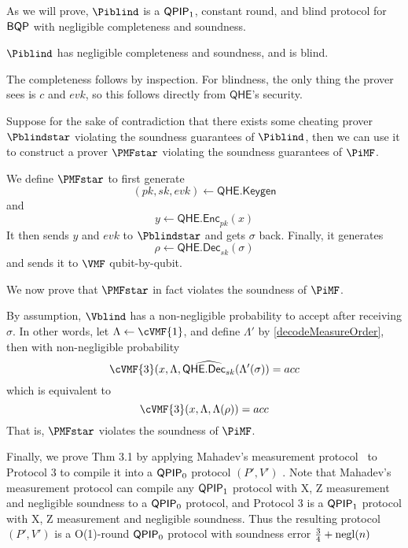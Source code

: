 As we will prove, $\Piblind$ is a $\operatorname{\mathsf{QPIP}}_1$, constant round, and blind protocol for $\operatorname{\mathsf{BQP}}$ with negligible completeness and soundness.

\begin{thm}
	$\Piblind$ has negligible completeness and soundness, and is blind.
\end{thm}
\begin{prf}
	The completeness follows by inspection.
	For blindness, the only thing the prover sees is $c$ and $evk$, so this follows directly from $\mathsf{QHE}$'s security.
	
	Suppose for the sake of contradiction that there exists some cheating prover $\Pblindstar$ violating the soundness guarantees of $\Piblind$,
	then we can use it to construct a prover $\PMFstar$ violating the soundness guarantees of $\PiMF$.


	We define $\PMFstar$ to first generate
	$$(pk, sk, evk)\leftarrow\mathsf{QHE.Keygen}$$
	and
	$$y\leftarrow\mathsf{QHE.Enc}_{pk}(x)$$
	It then sends $y$ and $evk$ to $\Pblindstar$ and gets $\sigma$ back.
	Finally, it generates
	$$\rho\leftarrow\mathsf{QHE.Dec}_{sk}(\sigma)$$
	and sends it to $\VMF$ qubit-by-qubit.

	We now prove that $\PMFstar$ in fact violates the soundness of $\PiMF$.

	By assumption, $\Vblind$ has a non-negligible probability to accept after receiving $\sigma$.
	In other words, let $\Lambda\leftarrow\cVMF{1}$, and define $\Lambda'$ by \cref{decodeMeasureOrder},
	then with non-negligible probability
	$$\cVMF{3}(x, \Lambda, \widehat{\mathsf{QHE.Dec}_{sk}}(\Lambda'(\sigma))=acc$$
	which is equivalent to
	$$\cVMF{3}(x, \Lambda, \Lambda(\rho))=acc$$
	That is, $\PMFstar$ violates the soundness of $\PiMF$.
\end{prf}


Finally, we prove Thm 3.1 by applying Mahadev's measurement protocol~\cite{mahadev_delegation} to Protocol 3 to compile it into a $\operatorname{\mathsf{QPIP}}_0$ protocol $(P', V')$ .
Note that Mahadev's measurement protocol can compile any $\operatorname{\mathsf{QPIP}}_1$ protocol with X, Z measurement and negligible soundness to a $\operatorname{\mathsf{QPIP}}_0$ protocol, and Protocol 3 is a $\operatorname{\mathsf{QPIP}}_1$ protocol with X, Z measurement and negligible soundness.
Thus the resulting protocol $(P', V')$ is a O(1)-round $\operatorname{\mathsf{QPIP}}_0$ protocol with soundness error $\frac{3}{4} + \operatorname{negl}(n)$

